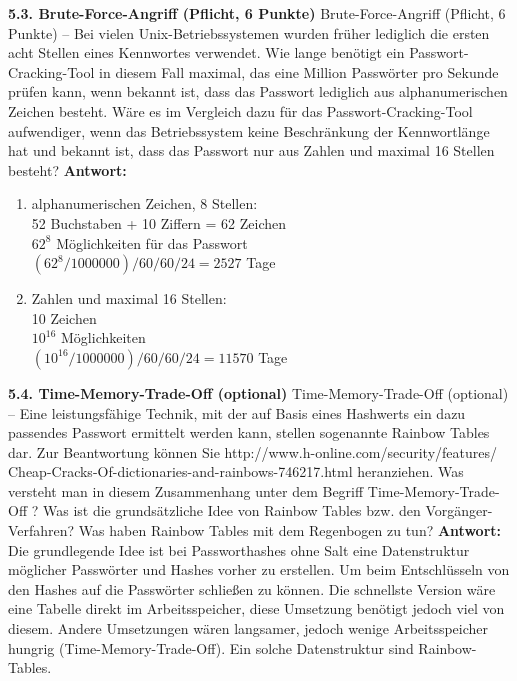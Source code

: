 \documentclass[ngerman]{fbi-aufgabenblatt}
\begin{document}
\textbf{5.3. Brute-Force-Angriff (Pflicht, 6 Punkte)}
Brute-Force-Angriff (Pflicht, 6 Punkte) – Bei vielen Unix-Betriebssystemen wurden früher lediglich die ersten acht Stellen eines Kennwortes verwendet. Wie lange benötigt ein Passwort-Cracking-Tool in diesem Fall maximal, das eine Million Passwörter pro Sekunde prüfen kann, wenn bekannt ist, dass das Passwort lediglich aus alphanumerischen Zeichen besteht. Wäre es im Vergleich dazu für das Passwort-Cracking-Tool aufwendiger, wenn das Betriebssystem keine Beschränkung der Kennwortlänge hat und bekannt ist, dass das Passwort nur aus Zahlen und maximal 16 Stellen besteht?
\textbf{Antwort:}
\begin{enumerate}
\item alphanumerischen Zeichen, 8 Stellen:\\
       52 Buchstaben + 10 Ziffern = 62 Zeichen\\
       $62^{8}$ Möglichkeiten für das Passwort\\
       $(62^{8}/1000000)/60/60/24 = 2527$ Tage\\
\item Zahlen und maximal 16 Stellen:\\
       10 Zeichen\\
       $10^{16}$ Möglichkeiten\\
       $(10^{16}/1000000)/60/60/24 = 11570$ Tage\\
\end{enumerate}
 

\textbf{5.4. Time-Memory-Trade-Off (optional)}
Time-Memory-Trade-Off (optional) – Eine leistungsfähige Technik, mit der auf Basis eines Hashwerts ein dazu passendes Passwort ermittelt werden kann, stellen sogenannte Rainbow Tables dar. Zur Beantwortung können Sie http://www.h-online.com/security/features/
Cheap-Cracks-Of-dictionaries-and-rainbows-746217.html heranziehen.
Was versteht man in diesem Zusammenhang unter dem Begriff Time-Memory-Trade-Off ?
Was ist die grundsätzliche Idee von Rainbow Tables bzw. den Vorgänger-Verfahren? Was haben Rainbow Tables mit dem Regenbogen zu tun?
\textbf{Antwort:}
Die grundlegende Idee ist bei Passworthashes ohne Salt eine Datenstruktur möglicher Passwörter und Hashes vorher zu erstellen. Um beim Entschlüsseln von den Hashes auf die Passwörter schließen zu können. Die schnellste Version wäre eine Tabelle direkt im Arbeitsspeicher, diese Umsetzung benötigt jedoch viel von diesem. Andere Umsetzungen wären langsamer, jedoch wenige Arbeitsspeicher hungrig (Time-Memory-Trade-Off). Ein solche Datenstruktur sind Rainbow-Tables.
\end{document}
